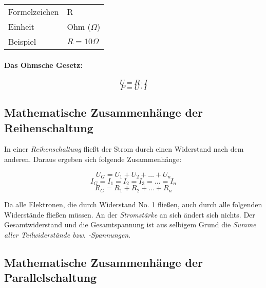 \documentclass[a4paper, 12pt]{report}
\begin{document}
\begin{center}
    \begin{tabular}{ ll }
		Formelzeichen & R            \\
		Einheit       & Ohm ($\Omega$)   \\
		Beispiel      & $R = 10\Omega$    \\
	\end{tabular}
\end{center}

\paragraph{Das Ohmsche Gesetz:}

\begin{center}
    \begin{equation}
        U = R \cdot I 
    \end{equation}
    \begin{equation}
        P = U \cdot I
    \end{equation}
\end{center}

\subsection{Mathematische Zusammenhänge der Reihenschaltung}

In einer \emph{Reihenschaltung} fließt der Strom durch einen Widerstand nach
dem anderen. Daraus ergeben sich folgende Zusammenhänge: 

\begin{center}
    \begin{equation}
        U_G = U_1 + U_2 + \dots + U_n 
    \end{equation}
    \begin{equation}
        I_G = I_1 = I_2 = I_3 = \dots = I_n 
    \end{equation}
    \begin{equation}
        R_G = R_1 + R_2 + \dots + R_n 
    \end{equation}
\end{center}

Da alle Elektronen, die durch Widerstand No. 1 fließen, auch durch alle
folgenden Widerstände fließen müssen. An der \emph{Stromstärke} an sich ändert 
sich nichts. Der Gesamtwiderstand und die Gesamtspannung ist aus selbigem Grund 
die \emph{Summe aller Teilwiderstände bzw. -Spannungen}.  

\subsection{Mathematische Zusammenhänge der Parallelschaltung}
\end{document}
